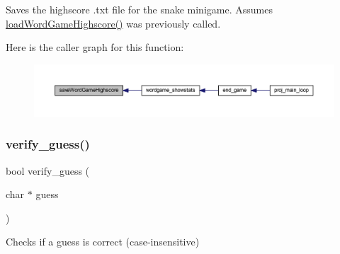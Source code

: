 Saves the highscore .txt file for the snake minigame. Assumes \mbox{\hyperlink{group__wordpicker_gab63191abcd00066c036c0b26e148651a}{load\+Word\+Game\+Highscore()}} was previously called. 

Here is the caller graph for this function\+:\nopagebreak
\begin{figure}[H]
\begin{center}
\leavevmode
\includegraphics[width=350pt]{group__wordpicker_gaaa45a5f1ebd34efbf6b74088634083bc_icgraph}
\end{center}
\end{figure}
\mbox{\label{group__wordpicker_ga6353a81725e186791f470cbd96c7ec1b}} 
\subsubsection{\texorpdfstring{verify\+\_\+guess()}{verify\_guess()}}
{\footnotesize\ttfamily bool verify\+\_\+guess (\begin{DoxyParamCaption}\item[{char $\ast$}]{guess }\end{DoxyParamCaption})}



Checks if a guess is correct (case-\/insensitive) 


